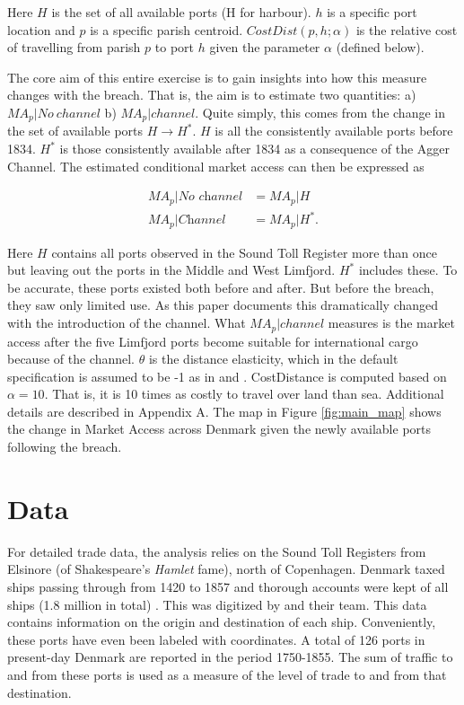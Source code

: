 \documentclass[11pt]{article}
\begin{document}
Here $H$ is the set of all available ports (H for harbour). $h$ is a specific port location and $p$ is a specific parish centroid. $CostDist(p, h; \alpha)$ is the relative cost of travelling from parish $p$ to port $h$ given the parameter $\alpha$ (defined below). 

The core aim of this entire exercise is to gain insights into how this measure changes with the breach. That is, the aim is to estimate two quantities: a) ${MA}_p|No\:channel$ b) ${MA}_p|channel$. Quite simply, this comes from the change in the set of available ports $H\rightarrow H^*$. $H$ is all the consistently available ports before 1834. $H^*$ is those consistently available after 1834 as a consequence of the Agger Channel. The estimated conditional market access can then be expressed as

\begin{equation}
\label{eq:MA3}
\begin{split}
{MA}_{p}|\textit{No channel} &= {MA}_{p}|H \\
{MA}_{p}|\textit{Channel} &= {MA}_{p}|H^*.
\end{split}
\end{equation}

Here $H$ contains all ports observed in the Sound Toll Register more than once but leaving out the ports in the Middle and West Limfjord. $H^*$ includes these. To be accurate, these ports existed both before and after. But before the breach, they saw only limited use. As this paper documents this dramatically changed with the introduction of the channel. What ${MA}_{p}|channel$ measures is the market access after the five Limfjord ports become suitable for international cargo because of the channel. $\theta$ is the distance elasticity, which in the default specification is assumed to be -1 as in \cite{Harris1954} and \cite{rauch2022a}. CostDistance is computed based on $\alpha = 10$. That is, it is 10 times as costly to travel over land than sea. Additional details are described in Appendix A. The map in Figure \ref{fig:main_map} shows the change in Market Access across Denmark given the newly available ports following the breach.

\FloatBarrier
\section{Data}
For detailed trade data, the analysis relies on the Sound Toll Registers from Elsinore (of Shakespeare's \textit{Hamlet} fame), north of Copenhagen. Denmark taxed ships passing through from 1420 to 1857 and thorough accounts were kept of all ships (1.8 million in total) \citep{gobel2010oresundstolden}. This was digitized by \cite{soundtoll_data} and their team. This data contains information on the origin and destination of each ship. Conveniently, these ports have even been labeled with coordinates. A total of 126 ports in present-day Denmark are reported in the period 1750-1855. The sum of traffic to and from these ports is used as a measure of the level of trade to and from that destination. 
\end{document}
